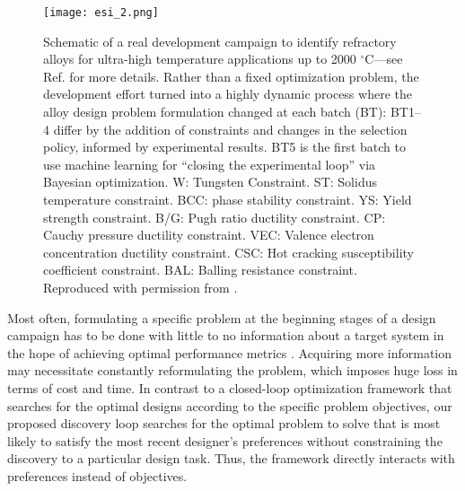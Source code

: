 \documentclass[final,5p,times,twocolumn]{elsarticle}
\begin{document}
\begin{figure*}[htb!]
\centering
\texttt{[image: esi\_2.png]}
\caption{Schematic of a real development campaign to identify refractory alloys for ultra-high temperature applications up to 2000 $^{\circ}$C---see Ref. \cite{acemi2024multi} for more details. Rather than a fixed optimization problem, the development effort turned into a highly dynamic process where the alloy design problem formulation changed at each batch (BT): BT1–4 differ by the addition of constraints and changes in the selection policy, informed by experimental results. BT5 is the first batch to use machine learning for “closing the experimental loop” via Bayesian optimization. W: Tungsten Constraint. ST: Solidus temperature constraint. BCC: phase stability constraint. YS: Yield strength constraint. B/G: Pugh ratio ductility constraint. CP: Cauchy pressure ductility constraint. VEC: Valence electron concentration ductility constraint. CSC: Hot cracking susceptibility coefficient constraint. BAL: Balling resistance constraint. Reproduced with permission from \cite{acemi2024multi}.}
\label{esi}
\end{figure*}

Most often, formulating a specific problem at the beginning stages of a design campaign has to be done with little to no information about a target system in the hope of achieving optimal performance metrics \cite{acemi2024multi}. Acquiring more information may necessitate constantly reformulating the problem, which imposes huge loss in terms of cost and time. In contrast to a closed-loop optimization framework that searches for the optimal designs according to the specific problem objectives, our proposed discovery loop searches for the optimal problem to solve that is most likely to satisfy the most recent designer's preferences without constraining the discovery to a particular design task. Thus, the framework directly interacts with preferences instead of objectives.
\end{document}
